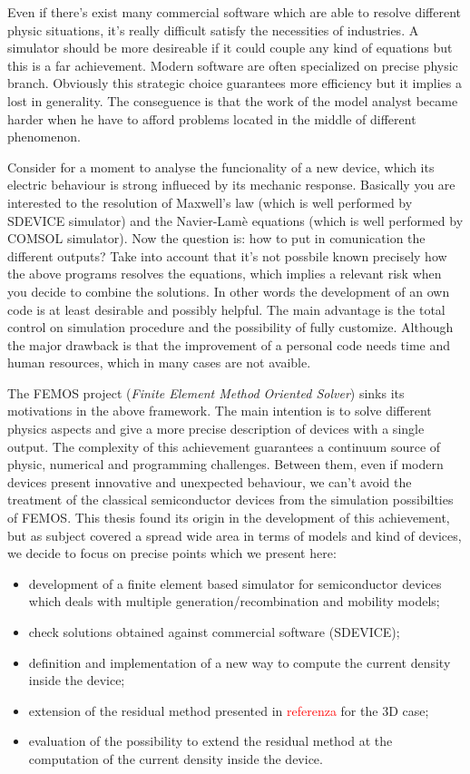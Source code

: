 Even if there's exist many commercial software which are able to resolve different physic situations, it's really difficult satisfy the necessities of industries. A simulator should be more desireable if it  could couple any kind of equations but this is a far achievement. Modern software are often specialized on precise physic branch. Obviously this strategic choice guarantees more efficiency but it implies a lost in generality. The conseguence is that the work of the model analyst became harder when he have to afford problems located in the middle of different phenomenon. 

Consider for a moment to analyse the funcionality of a new device, which its electric behaviour is strong influeced by its mechanic response. Basically you are interested to the resolution of Maxwell's law  (which is well performed by SDEVICE simulator) and the Navier-Lam\`e equations (which is well performed by COMSOL simulator). Now the question is: how to put in comunication the different outputs?
Take into account that it's not possbile known precisely how the above programs resolves the equations, which implies a relevant risk when you decide to combine the solutions. 
In other words the development of an own code is at least desirable and possibly helpful. The main advantage is the total control on simulation procedure and the possibility of fully customize. Although the major drawback is that the improvement of a personal code needs time and human resources, which in many cases are not avaible.   

The FEMOS project (\textit{Finite Element Method Oriented Solver}) sinks its motivations in the above framework. The main intention is to solve different physics aspects and give a more precise description of devices with a single output. The complexity of this achievement guarantees a continuum source of physic, numerical and programming challenges. 
Between them, even if modern devices present innovative and unexpected behaviour, we can't avoid the treatment of the classical semiconductor devices from the simulation possibilties of FEMOS.
This thesis found its origin in the development of this achievement, but as subject covered a spread wide area in terms of models and kind of devices, we decide to focus on precise points which we present here:
\begin{itemize}
\item development of a finite element based simulator for semiconductor devices which deals with multiple generation/recombination and mobility models;
\item check solutions obtained against commercial software (SDEVICE);
\item definition and implementation of a new way to compute the current density inside the device;
\item extension of the residual method presented in \textcolor{red}{referenza} for the 3D case;
\item evaluation of the possibility to extend the residual method at the computation of the current density inside the device.
\end{itemize}


